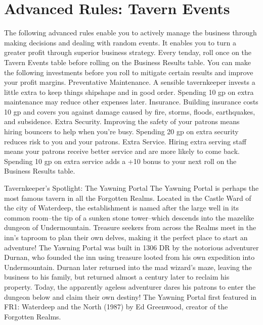 \documentclass[10pt,a4paper,twoside,twocolumn,openany,bg=print,nodeprecatedcode]{dndbook}
\begin{document}
\section{Advanced Rules: Tavern Events}
The following advanced rules enable you to actively manage the business through making decisions and dealing with random events. It enables you to turn a greater profit through superior business strategy.
Every tenday, roll once on the Tavern Events table before rolling on the Business Results table. You can make the following investments before you roll to mitigate certain results and improve your profit margins.
Preventative Maintenance. A sensible tavernkeeper invests a little extra to keep things shipshape and in good order. Spending 10 gp on extra maintenance may reduce other expenses later.
Insurance. Building insurance costs 10 gp and covers you against damage caused by fire, storms, floods, earthquakes, and subsidence.
Extra Security. Improving the safety of your patrons means hiring bouncers to help when you're busy. Spending 20 gp on extra security reduces risk to you and your patrons.
Extra Service. Hiring extra serving staff means your patrons receive better service and are more likely to come back. Spending 10 gp on extra service adds a +10 bonus to your next roll on the Business Results table.
\begin{DndComment}{Tavernkeeper's Spotlight: The Yawning Portal}
The Yawning Portal is perhaps the most famous tavern in all the Forgotten Realms. Located in the Castle Ward of the city of Waterdeep, the establishment is named after the large well in its common room–the tip of a sunken stone tower–which descends into the mazelike dungeon of Undermountain. Treasure seekers from across the Realms meet in the inn's taproom to plan their own delves, making it the perfect place to start an adventure!
The Yawning Portal was built in 1306 DR by the notorious adventurer Durnan, who founded the inn using treasure looted from his own expedition into Undermountain. Durnan later returned into the mad wizard's maze, leaving the business to his family, but returned almost a century later to reclaim his property. Today, the apparently ageless adventurer dares his patrons to enter the dungeon below and claim their own destiny!
The Yawning Portal first featured in FR1: Waterdeep and the North (1987) by Ed Greenwood, creator of the Forgotten Realms.
\end{DndComment}
\end{document}
